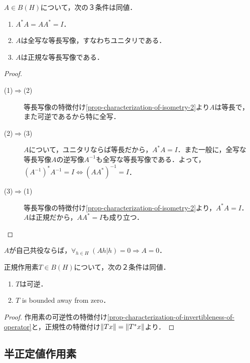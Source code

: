 \documentclass[uplatex,dvipdfmx]{jsreport}
\begin{document}
\begin{proposition}[同型の特徴付け]
    $A\in B(H)$について，次の３条件は同値．
    \begin{enumerate}
        \item $A^*A=AA^*=I$．
        \item $A$は全写な等長写像，すなわちユニタリである．
        \item $A$は正規な等長写像である．
    \end{enumerate}
\end{proposition}
\begin{proof}\mbox{}
    \begin{description}
        \item[(1)$\Rightarrow$(2)] 等長写像の特徴付け\ref{prop-characterization-of-isometry-2}より$A$は等長で，また可逆であるから特に全写．
        \item[(2)$\Rightarrow$(3)] $A$について，ユニタリならば等長だから，$A^*A=I$．また一般に，全写な等長写像$A$の逆写像$A^{-1}$も全写な等長写像である．よって，$(A^{-1})^*A^{-1}=I\Leftrightarrow(AA^*)^{-1}=I$．
        \item[(3)$\Rightarrow$(1)] 等長写像の特徴付け\ref{prop-characterization-of-isometry-2}より，$A^*A=I$．$A$は正規だから，$AA^*=I$も成り立つ．
    \end{description}
\end{proof}

\begin{corollary}
    $A$が自己共役ならば，$\forall_{h\in H}\;(Ah|h)=0\Rightarrow A=0$．
\end{corollary}

\begin{corollary}[正規作用素の可逆性]\label{prop-characterization-of-invertibleness-of-normal-operator}
    正規作用素$T\in B(H)$について，次の２条件は同値．
    \begin{enumerate}
        \item $T$は可逆．
        \item $T$ is bounded away from zero．
    \end{enumerate}
\end{corollary}
\begin{proof}
    作用素の可逆性の特徴付け\ref{prop-characterization-of-invertibleness-of-operator}と，正規性の特徴付け$\|Tx\|=\|T^*x\|$より．
\end{proof}

\subsection{半正定値作用素}
\end{document}
